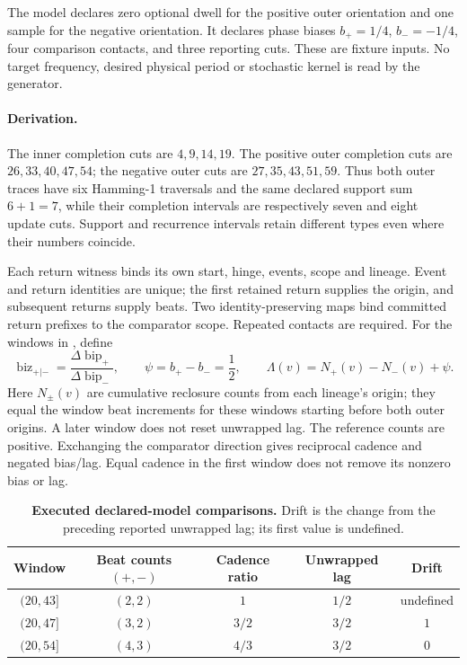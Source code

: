 The model declares zero optional dwell for the positive outer orientation and one sample for the negative orientation. It declares phase biases \(b_+=1/4\), \(b_-=-1/4\), four comparison contacts, and three reporting cuts. These are fixture inputs. No target frequency, desired physical period or stochastic kernel is read by the generator.

\paragraph{Derivation.}
The inner completion cuts are \(4,9,14,19\). The positive outer completion cuts are \(26,33,40,47,54\); the negative outer cuts are \(27,35,43,51,59\). Thus both outer traces have six Hamming-1 traversals and the same declared support sum \(6+1=7\), while their completion intervals are respectively seven and eight update cuts. Support and recurrence intervals retain different types even where their numbers coincide.

Each return witness binds its own start, hinge, events, scope and lineage. Event and return identities are unique; the first retained return supplies the origin, and subsequent returns supply beats. Two identity-preserving maps bind committed return prefixes to the comparator scope. Repeated contacts are required. For the windows in , define
\[
\operatorname{biz}_{+|-}=\frac{\Delta\operatorname{bip}_+}{\Delta\operatorname{bip}_-},\qquad
\psi=b_+-b_-=\frac12,\qquad
\Lambda(v)=N_+(v)-N_-(v)+\psi.
\]
Here \(N_\pm(v)\) are cumulative reclosure counts from each lineage's origin; they equal the window beat increments for these windows starting before both outer origins. A later window does not reset unwrapped lag. The reference counts are positive. Exchanging the comparator direction gives reciprocal cadence and negated bias/lag. Equal cadence in the first window does not remove its nonzero bias or lag.

\begin{table}[H]
\centering\small
\caption{\textbf{Executed declared-model comparisons.} Drift is the change from the preceding reported unwrapped lag; its first value is undefined.}
\label{tab:manual2-temporal-model}
\begin{tabular}{@{}ccccc@{}}
\toprule
Window & Beat counts \((+,-)\) & Cadence ratio & Unwrapped lag & Drift\\
\midrule
\((20,43]\) & \((2,2)\) & \(1\) & \(1/2\) & undefined\\
\((20,47]\) & \((3,2)\) & \(3/2\) & \(3/2\) & \(1\)\\
\((20,54]\) & \((4,3)\) & \(4/3\) & \(3/2\) & \(0\)\\
\bottomrule
\end{tabular}
\end{table}

